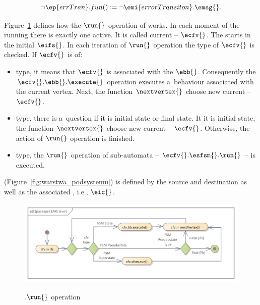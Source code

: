 \documentclass[11pt,oneside,a4paper]{article}
\newcommand{\Figure}[0]{Figure}
\begin{document}
	\begin{equation}
		\neg \ep{errTran}.fun() := \neg \emi{errorTransiton}.\emsg{}.
		\label{eq:p-n-ec}
	\end{equation}			
	
	\Figure{}~\ref{fig:run} defines how the $\run{}$ operation of \Fsm{} works. In each moment of the \Subsystem{} running there is exactly one \FsmVertex{} active. It is called current \FsmVertex{} -- $\ecfv{}$. The \Fsm{} starts in the initial \FsmState{} $\eifs{}$. In each iteration of $\run{}$ operation the type of $\ecfv{}$ is checked. If $\ecfv{}$ is of:
	\begin{itemize}
		\item \FsmState{} type, it means that $\ecfv{}$ is associated with the \BasicBehaviour{} $\ebb{}$. Consequently the $\ecfv{}.\ebb{}.\execute{}$ operation executes a~behaviour associated with the current vertex. Next, the function $\nextvertex{}$ choose new current \FsmVertex{} -- $\ecfv{}$.
		\item \FsmPseudostate{} type, there is a~question if it is initial state or final state. It it is initial state, the function $\nextvertex{}$ choose new current \FsmVertex{} -- $\ecfv{}$. Otherwise, the action of $\run{}$ operation is finished.
		\item \FsmSuperstate{} type, the $\run{}$ operation of sub-automata -- $\ecfv{}.\esfsm{}.\run{}$ -- is executed.
	\end{itemize}
	
	
	\FsmTransition{} (\Figure{}~\ref{fig:warstwa_podsystemu}) is defined by the source and destination \FsmStates{}
	as well as the associated \InitialCondition{}, i.e., \Predicate{} $\eic{}$.
	
	\begin{figure}[H]
		\centering
		\begin{center}
			{\includegraphics[width=0.85\columnwidth]{img/basic_earl_model/run.png}}
		\end{center}
		\caption{\Fsm{}.$\run{}$ operation}
		\label{fig:run}
	\end{figure}	
	
\end{document}
